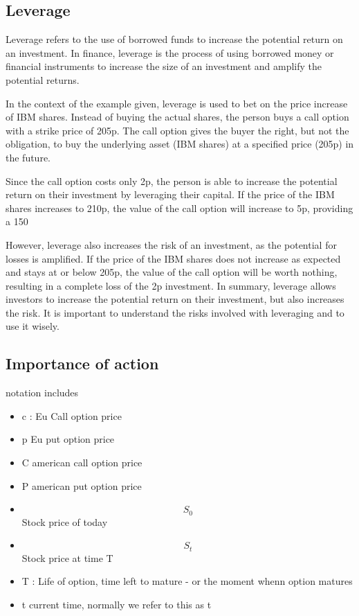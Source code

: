 \documentclass{article}
\theoremstyle{mytheoremstyle}
\theoremstyle{mytheoremstyle}
\theoremstyle{myproblemstyle}
\begin{document}
\subsection{Leverage}
Leverage refers to the use of borrowed funds to increase the potential return on an investment. In finance, leverage is the process of using borrowed money or financial instruments to increase the size of an investment and amplify the potential returns.

In the context of the example given, leverage is used to bet on the price increase of IBM shares. Instead of buying the actual shares, the person buys a call option with a strike price of 205p. The call option gives the buyer the right, but not the obligation, to buy the underlying asset (IBM shares) at a specified price (205p) in the future.

Since the call option costs only 2p, the person is able to increase the potential return on their investment by leveraging their capital. If the price of the IBM shares increases to 210p, the value of the call option will increase to 5p, providing a 150%

However, leverage also increases the risk of an investment, as the potential for losses is amplified. If the price of the IBM shares does not increase as expected and stays at or below 205p, the value of the call option will be worth nothing, resulting in a complete loss of the 2p investment.
In summary, leverage allows investors to increase the potential return on their investment, but also increases the risk. It is important to understand the risks involved with leveraging and to use it wisely.

\subsection{Importance of action}
notation includes
\begin{itemize}
	\item c : Eu Call option price
	\item p Eu put option price
	\item C american call option price
	\item P american put option price
	\item $$S_0$$ Stock price of today
	\item $$S_t$$ Stock price at time T
	\item T : Life of option, time left to mature - or the moment whenn option matures
	\item t current time, normally we refer to this as t
\end{itemize}
\end{document}
